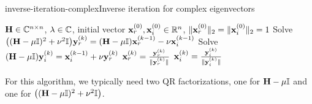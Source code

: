 \begin{Algorithm*}{inverse-iteration-complex}{Inverse iteration for complex eigenvectors}
    \begin{algorithmic}[1]
    \Require $\mathbf H\in\mathbb C^{n\times n}$, $\lambda\in\mathbb C$, initial vector $\mathbf x_r^{(0)},\mathbf x_i^{(0)}\in\mathbb R^n$, $\lVert\mathbf x_r^{(0)}\rVert_2 = \lVert\mathbf x_i^{(0)}\rVert_2 = 1$
    \State Solve $\bigl((\mathbf H-\mu\mathbb I)^2+\nu^2\mathbb I\bigr) \mathbf y_r^{(k)}
    = (\mathbf H-\mu\mathbb I) \mathbf x_r^{(k-1)} - \nu \mathbf x_i^{(k-1)}$
      \State Solve $(\mathbf H-\mu\mathbb I) \mathbf y_i^{(k)} = \mathbf x_i^{(k-1)} + \nu\mathbf y_r^{(k)}$
    \State $\mathbf x_r^{(k)} = \frac{\mathbf y_r^{(k)}}{\lVert\mathbf y_r^{(k)}\rVert}$
    \State $\mathbf x_i^{(k)} = \frac{\mathbf y_i^{(k)}}{\lVert\mathbf y_i^{(k)}\rVert}$
    \EndFor
  \end{algorithmic}
\end{Algorithm*}

\begin{todo}
\begin{remark}
  For this algorithm, we typically need two QR factorizations, one for
  $\mathbf H-\mu\mathbb I$ and one for $\bigl((\mathbf H-\mu\mathbb I)^2+\nu^2\mathbb I\bigr)$.
\end{remark}
\end{todo}

